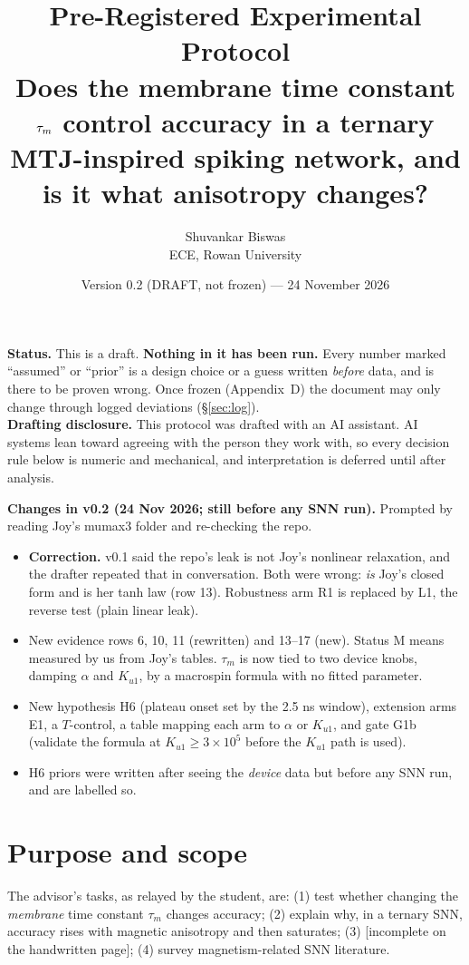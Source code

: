 \documentclass[10pt,a4paper]{article}
\title{\textbf{Pre-Registered Experimental Protocol}\\[2pt]
\large Does the membrane time constant $\taum$ control accuracy in a ternary MTJ-inspired spiking network, and is it what anisotropy changes?}
\author{Shuvankar Biswas \\ ECE, Rowan University}
\date{Version 0.2 (DRAFT, not frozen) --- 24 November 2026}
\newcommand{\code}[1]{\path{#1}}
\newcommand{\taum}{\tau_m}
\begin{document}
\maketitle

\begin{tcolorbox}
\textbf{Status.} This is a draft. \textbf{Nothing in it has been run.} Every number marked ``assumed'' or ``prior'' is a design choice or a guess written \emph{before} data, and is there to be proven wrong. Once frozen (Appendix~D) the document may only change through logged deviations (\S\ref{sec:log}).\\
\textbf{Drafting disclosure.} This protocol was drafted with an AI assistant. AI systems lean toward agreeing with the person they work with, so every decision rule below is numeric and mechanical, and interpretation is deferred until after analysis.
\end{tcolorbox}

\begin{tcolorbox}
\textbf{Changes in v0.2 (24 Nov 2026; still before any SNN run).} Prompted by reading Joy's mumax3 folder and re-checking the repo.
\begin{itemize}
\item \textbf{Correction.} v0.1 said the repo's leak is not Joy's nonlinear relaxation, and the drafter repeated that in conversation. Both were wrong: \code{leak()} \emph{is} Joy's closed form and \code{integrate()} is her tanh law (row 13). Robustness arm R1 is replaced by L1, the reverse test (plain linear leak).
\item New evidence rows 6, 10, 11 (rewritten) and 13--17 (new). Status M means measured by us from Joy's tables. $\taum$ is now tied to two device knobs, damping $\alpha$ and $K_{u1}$, by a macrospin formula with no fitted parameter.
\item New hypothesis H6 (plateau onset set by the 2.5 ns window), extension arms E1, a $T$-control, a table mapping each arm to $\alpha$ or $K_{u1}$, and gate G1b (validate the formula at $K_{u1}\ge3\times10^5$ before the $K_{u1}$ path is used).
\item H6 priors were written after seeing the \emph{device} data but before any SNN run, and are labelled so.
\end{itemize}
\end{tcolorbox}

\section{Purpose and scope}
The advisor's tasks, as relayed by the student, are: (1) test whether changing the \emph{membrane} time constant $\taum$ changes accuracy; (2) explain why, in a ternary SNN, accuracy rises with magnetic anisotropy and then saturates; (3) [incomplete on the handwritten page]; (4) survey magnetism-related SNN literature.
\end{document}
